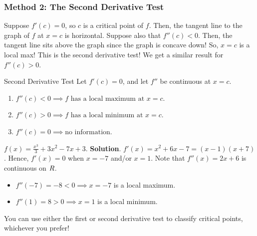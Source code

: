 \subsubsection*{Method 2: The Second Derivative Test}
Suppose $ f'(c)=0 $, so $ c $ is a critical point of $ f $. Then, the tangent line to the
graph of $ f $ at $ x=c $ is horizontal. Suppose also that $ f''(c)<0 $. Then, the tangent line sits
above the graph since the graph is concave down! So, $ x=c $ is a local max! This is the second derivative
test! We get a similar result for $ f''(c)>0 $.
\begin{Theorem}{Second Derivative Test}{}
    Let $ f'(c)=0 $, and let $ f'' $ be continuous at $ x=c $.
    \begin{enumerate}[(1)]
        \item $ f''(c)<0\implies \text{$f$ has a local maximum at $x=c$} $.
        \item $ f''(c)>0\implies \text{$f$ has a local minimum at $x=c$} $.
        \item $ f''(c)=0\implies \text{no information} $.
    \end{enumerate}
\end{Theorem}
\begin{Example}{}{}
    $ f(x)=\frac{x^3}{3}+3x^2-7x+3 $.
    \tcblower{}
    \textbf{Solution}. $ f'(x)=x^2+6x-7=(x-1)(x+7) $. Hence, $ f'(x)=0 $ when $ x=-7 $ and/or $ x=1 $.
    Note that $ f''(x)=2x+6 $ is continuous on $ \relax{R} $.
    \begin{itemize}
        \item $ f''(-7)=-8<0 \implies x=-7 $ is a local maximum.
        \item $ f''(1)=8>0 \implies x=1 $ is a local minimum.
    \end{itemize}
\end{Example}
\begin{Remark}{}{}
    You can use either the first or second derivative test to classify critical points, whichever you prefer!
\end{Remark}
